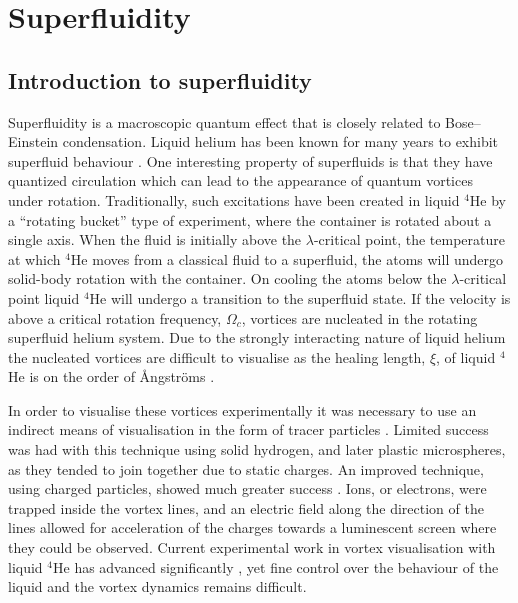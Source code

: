 \section{Superfluidity}\label{sec:superfluid}
\subsection{Introduction to superfluidity}

Superfluidity is a macroscopic quantum effect that is closely related to Bose--Einstein condensation. Liquid helium has been known for many years to exhibit superfluid behaviour \cite{BEC:Penrose_pr_1956}. One interesting property of superfluids is that they have quantized circulation which can lead to the appearance of quantum vortices under rotation. Traditionally, such excitations have been created in liquid $^4$He by a ``rotating bucket'' type of experiment, where the container is rotated about a single axis. When the fluid is initially above the $\lambda$-critical point, the temperature at which $^4$He moves from a classical fluid to a superfluid, the atoms will undergo solid-body rotation with the container. On cooling the atoms below the $\lambda$-critical point liquid $^4$He will undergo a transition to the superfluid state. If the velocity is above a critical rotation frequency, $\Omega_c$, vortices are nucleated in the rotating superfluid helium system. Due to the strongly interacting nature of liquid helium the nucleated vortices are difficult to visualise as the healing length, $\xi$, of liquid $^4$He is on the order of {\r{A}}ngstr{\"o}ms \cite{BEC:Srinivasen_pramana_2006}.

In order to visualise these vortices experimentally it was necessary to use an indirect means of visualisation in the form of tracer particles \cite{BEC:Packard_physb_1982}. Limited success was had with this technique using solid hydrogen, and later plastic microspheres, as they tended to join together due to static charges. An improved technique, using charged particles, showed much greater success \cite{Vtx:Packard_prl_1969}. Ions, or electrons, were trapped inside the vortex lines, and an electric field along the direction of the lines allowed for acceleration of the charges towards a luminescent screen where they could be observed. Current experimental work in vortex visualisation with liquid $^4$He has advanced significantly \cite{Vtx:Tsubota_arxiv_2010,Vtx:Guo_pnas_2014}, yet fine control over the behaviour of the liquid and the vortex dynamics remains difficult.

